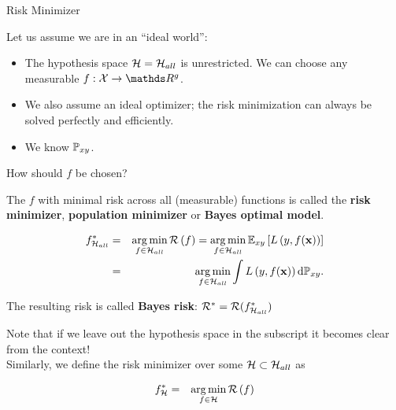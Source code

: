 \documentclass[11pt,compress,t,notes=noshow, xcolor=table]{beamer}
\begin{document}
\begin{vbframe}{Risk Minimizer}





\lz 

Let us assume we are in an \enquote{ideal world}: 

\begin{itemize}
	\item The hypothesis space $\mathcal{H}=\mathcal{H}_{all}$ is unrestricted. We can choose any measurable $f: \Xspace \to \R^g$. 
	\item We also assume an ideal optimizer; the risk minimization can always be 
        solved perfectly and efficiently.
	\item We know $\mathbb{P}_{xy}$. 
\end{itemize}

How should $f$ be chosen? 


\framebreak 

The $f$ with minimal risk across all (measurable) functions 
is called the \textbf{risk minimizer}, \textbf{population minimizer} or \textbf{Bayes optimal model}. 

\begin{eqnarray*}
	f^{\ast}_{\mathcal{H}_{all}} &=& \operatorname*{arg\,min}_{f \in \mathcal{H}_{all}} \mathcal{R}\left(f\right) = \operatorname*{arg\,min}_{f \in \mathcal{H}_{all}}\mathbb{E}_{xy}\left[L\left(y, f(\mathbf{x})\right)\right]\\ &=&  \operatorname*{arg\,min}_{f \in \mathcal{H}_{all}}\int L\left(y, f(\mathbf{x})\right) \text{d}\mathbb{P}_{xy}. 
\end{eqnarray*}

The resulting risk is called \textbf{Bayes risk}:  $\mathcal{R}^\ast_{} = \mathcal{R}(f^{\ast}_{\mathcal{H}_{all}})$

\lz

Note that if we leave out the hypothesis space in the subscript it becomes clear from the context!\\

Similarly, we define the risk minimizer over some $\mathcal{H} \subset \mathcal{H}_{all}$ as

\begin{eqnarray*}
	f^{\ast}_{\mathcal{H}} &=& \operatorname*{arg\,min}_{f \in \mathcal{H}} \mathcal{R}\left(f\right)
\end{eqnarray*}





\end{vbframe}
\end{document}
